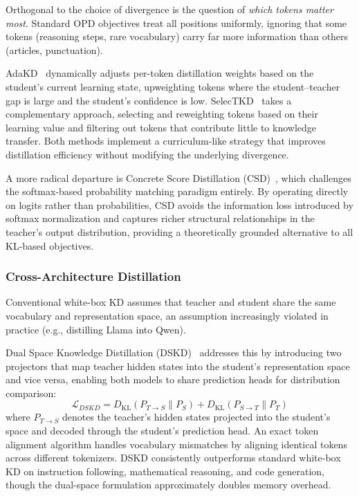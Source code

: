 \documentclass{article} %
\newcommand{\KL}{D_{\mathrm{KL}}}
\begin{document}
Orthogonal to the choice of divergence is the question of \emph{which tokens matter most}. Standard OPD objectives treat all positions uniformly, ignoring that some tokens (reasoning steps, rare vocabulary) carry far more information than others (articles, punctuation).

AdaKD~\citep{2510.11615} dynamically adjusts per-token distillation weights based on the student's current learning state, upweighting tokens where the student--teacher gap is large and the student's confidence is low. SelecTKD~\citep{2510.24021} takes a complementary approach, selecting and reweighting tokens based on their learning value and filtering out tokens that contribute little to knowledge transfer. Both methods implement a curriculum-like strategy that improves distillation efficiency without modifying the underlying divergence.

A more radical departure is Concrete Score Distillation (CSD)~\citep{2509.25837}, which challenges the softmax-based probability matching paradigm entirely. By operating directly on logits rather than probabilities, CSD avoids the information loss introduced by softmax normalization and captures richer structural relationships in the teacher's output distribution, providing a theoretically grounded alternative to all KL-based objectives.

\subsubsection{Cross-Architecture Distillation}

Conventional white-box KD assumes that teacher and student share the same vocabulary and representation space, an assumption increasingly violated in practice (e.g., distilling Llama into Qwen).

Dual Space Knowledge Distillation (DSKD)~\citep{2504.11426} addresses this by introducing two projectors that map teacher hidden states into the student's representation space and vice versa, enabling both models to share prediction heads for distribution comparison:
\begin{equation}
    \mathcal{L}_{DSKD} = \KL(P_{T \to S} \parallel P_S) + \KL(P_{S \to T} \parallel P_T)
\end{equation}
where $P_{T \to S}$ denotes the teacher's hidden states projected into the student's space and decoded through the student's prediction head. An exact token alignment algorithm handles vocabulary mismatches by aligning identical tokens across different tokenizers. DSKD consistently outperforms standard white-box KD on instruction following, mathematical reasoning, and code generation, though the dual-space formulation approximately doubles memory overhead.
\end{document}
